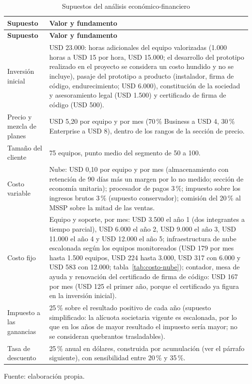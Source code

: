 \begin{longtable}{p{6cm}p{8.3cm}}
\caption{Supuestos del análisis económico-financiero}\label{tab:supuestos-fin}\\
\hline
\textbf{Supuesto} & \textbf{Valor y fundamento} \\
\hline
\endfirsthead
\hline
\textbf{Supuesto} & \textbf{Valor y fundamento} \\
\hline
\endhead
Inversión inicial & USD 23.000: horas adicionales del equipo valorizadas (1.000 horas a USD 15 por hora, USD 15.000; el desarrollo
del prototipo realizado en el proyecto se considera un costo hundido y no se incluye),
pasaje del prototipo a producto (instalador, firma de código, endurecimiento; USD 6.000),
constitución de la sociedad y asesoramiento legal (USD 1.500) y certificado de firma de código
(USD 500). \\
Precio y mezcla de planes & USD 5,20 por equipo y por mes (70\,\% Business a USD 4, 30\,\% Enterprise a
USD 8), dentro de los rangos de la sección de precio. \\
Tamaño del cliente & 75 equipos, punto medio del segmento de 50 a 100. \\
Costo variable & Nube: USD 0,10 por equipo y por mes (almacenamiento con retención de 90 días más un margen
por lo no medido; sección de economía unitaria); procesador de pagos 3\,\%; impuesto sobre los
ingresos brutos 3\,\% (supuesto conservador); comisión del 20\,\% al MSSP sobre la mitad de las
ventas. \\
Costo fijo & Equipo y soporte, por mes: USD 3.500 el año 1 (dos integrantes a tiempo parcial),
USD 6.000 el año 2, USD 9.000 el año 3, USD 11.000 el año 4 y USD 12.000 el año 5;
infraestructura de nube escalonada según los equipos monitoreados (USD 179 por mes hasta 1.500 equipos, USD 224 hasta 3.000, USD 317 con 6.000
y USD 583 con 12.000; tabla~\ref{tab:costo-nube}); contador, mesa de ayuda y renovación del certificado de
firma de código: USD 167 por mes (USD 125 el primer año, porque el certificado ya figura en la inversión inicial). \\
Impuesto a las ganancias & 25\,\% sobre el resultado positivo de cada año (supuesto simplificado: la alícuota societaria vigente es escalonada, por lo que en los años de mayor resultado el impuesto sería mayor; no se consideran quebrantos trasladables). \\
Tasa de descuento & 25\,\% anual en dólares, construida por acumulación (ver el párrafo
siguiente), con sensibilidad entre 20\,\% y 35\,\%. \\
\hline
\end{longtable}
{\small Fuente: elaboración propia.\par}

